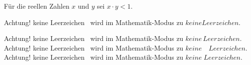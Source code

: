 \documentclass{article}
\begin{document}
F\"ur die reellen Zahlen \begin{math}x\end{math} und \(y\) sei $x \cdot y < 1$.

Achtung! \glqq keine Leerzeichen\grqq~ wird im Mathematik-Modus zu \glqq$keine Leerzeichen$\grqq.

Achtung! \glqq keine Leerzeichen\grqq~ wird im Mathematik-Modus zu \glqq$keine \, Leerzeichen$\grqq. \\
Achtung! \glqq keine Leerzeichen\grqq~ wird im Mathematik-Modus zu \glqq$keine \quad Leerzeichen$\grqq. \\
Achtung! \glqq keine Leerzeichen\grqq~ wird im Mathematik-Modus zu \glqq$keine \; Leerzeichen$\grqq. \\
\end{document}
